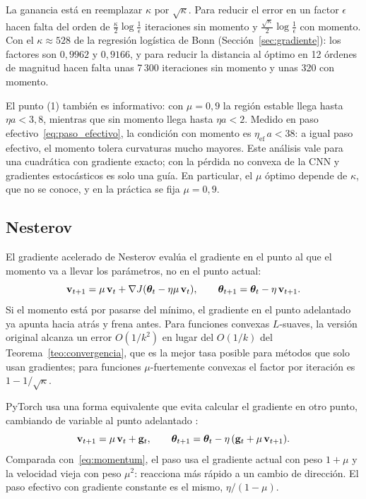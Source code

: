 La ganancia está en reemplazar $\kappa$ por $\sqrt\kappa$. Para reducir el error en un factor $\epsilon$ hacen falta del orden de
$\frac{\kappa}{2}\log\frac1\epsilon$ iteraciones sin momento y $\frac{\sqrt\kappa}{2}\log\frac1\epsilon$ con momento. Con el
$\kappa \approx 528$ de la regresión logística de Bonn (Sección~\ref{sec:gradiente}): los factores son $0{,}9962$ y $0{,}9166$, y
para reducir la distancia al óptimo en 12 órdenes de magnitud hacen falta unas 7\,300 iteraciones sin momento y unas 320 con
momento.

El punto (1) también es informativo: con $\mu = 0{,}9$ la región estable llega hasta $\eta a < 3{,}8$, mientras que sin momento
llega hasta $\eta a < 2$. Medido en paso efectivo~\eqref{eq:paso_efectivo}, la condición con momento es
$\eta_\text{ef}\,a < 38$: a igual paso efectivo, el momento tolera curvaturas mucho mayores. Este análisis vale para una
cuadrática con gradiente exacto; con la pérdida no convexa de la CNN y gradientes estocásticos es solo una guía. En
particular, el $\mu$ óptimo depende de $\kappa$, que no se conoce, y en la práctica se fija $\mu = 0{,}9$.

\subsection{Nesterov \parencite{nesterov1983,sutskever2013}}

El gradiente acelerado de Nesterov evalúa el gradiente en el punto al que el momento va a llevar los parámetros, no en el
punto actual:
\begin{equation}
  \mathbf{v}_{t+1} = \mu\,\mathbf{v}_t + \nabla J(\boldsymbol{\theta}_t - \eta\mu\,\mathbf{v}_t), \qquad \boldsymbol{\theta}_{t+1} = \boldsymbol{\theta}_t - \eta\,\mathbf{v}_{t+1}.
  \label{eq:nesterov}
\end{equation}
Si el momento está por pasarse del mínimo, el gradiente en el punto adelantado ya apunta hacia atrás y frena antes. Para
funciones convexas $L$-suaves, la versión original alcanza un error $O(1/k^2)$ en lugar del $O(1/k)$ del
Teorema~\ref{teo:convergencia}, que es la mejor tasa posible para métodos que solo usan gradientes; para funciones
$\mu$-fuertemente convexas el factor por iteración es $1 - 1/\sqrt\kappa$.

PyTorch usa una forma equivalente que evita calcular el gradiente en otro punto, cambiando de variable al punto adelantado
\parencite{sutskever2013}:
\begin{equation}
  \mathbf{v}_{t+1} = \mu\,\mathbf{v}_t + \mathbf{g}_t, \qquad \boldsymbol{\theta}_{t+1} = \boldsymbol{\theta}_t - \eta\,(\mathbf{g}_t + \mu\,\mathbf{v}_{t+1}).
\end{equation}
Comparada con~\eqref{eq:momentum}, el paso usa el gradiente actual con peso $1 + \mu$ y la velocidad vieja con peso $\mu^2$:
reacciona más rápido a un cambio de dirección. El paso efectivo con gradiente constante es el mismo, $\eta/(1 - \mu)$.

